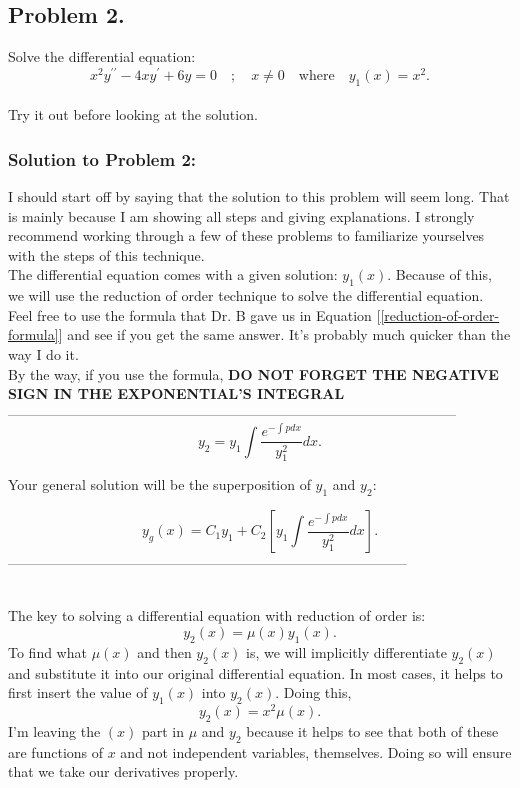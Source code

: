 \documentclass[a4paper,12pt]{article} %
\begin{document}
\pagebreak

\subsection*{Problem 2.} Solve the differential equation:
$$ x^2 y^{\prime \prime}-4 x y^{\prime}+6 y=0 \quad ; \quad x\neq0 \quad \text{where} \quad y_1(x) = x^2.$$
\\
 
Try it out before looking at the solution.
\pagebreak
 
 \subsubsection*{Solution to Problem 2:}
 I should start off by saying that the solution to this problem will seem long. That is mainly because I am showing all steps and giving explanations. I strongly recommend working through a few of these problems to familiarize yourselves with the steps of this technique.\\
 
 The differential equation comes with a given solution: $y_1(x).$ Because of this, we will use the reduction of order technique to solve the differential equation.\\
 
 Feel free to use the formula that Dr. B gave us in Equation [\ref{reduction-of-order-formula}] and see if you get the same answer. It's probably much quicker than the way I do it.\\
 
 By the way, if you use the formula, \textbf{DO NOT FORGET THE NEGATIVE SIGN IN THE EXPONENTIAL'S INTEGRAL}\\
 
 ------------------------------------------------------------------------------------------------
$$
 	y_2 = y_1\int{\frac{e^{-\int pdx}}{y_1^2}}dx.
$$
 
 Your general solution will be the superposition of $y_1$ and $y_2$:
 
 \begin{equation}
 	y_g(x) = C_1y_1 + C_2\left[y_1\int{\frac{e^{-\int pdx}}{y_1^2}}dx\right].\label{reduction-of-order-formula}
 \end{equation}
 --------------------------------------------------------------------------------------\\
 \
 
 The key to solving a differential equation with reduction of order is:
 $$ y_2(x) = \mu(x)y_1(x). $$
 To find what $\mu(x)$ and then $y_2(x)$ is, we will implicitly differentiate $y_2(x)$ and substitute it into our original differential equation. In most cases, it helps to first insert the value of $y_1(x)$ into $y_2(x)$. Doing this,
 $$ y_2(x) = x^2\mu(x). $$
 I'm leaving the $(x)$ part in $\mu$ and $y_2$ because it helps to see that both of these are functions of $x$ and not independent variables, themselves. Doing so will ensure that we take our derivatives properly.\\
 
\end{document}

